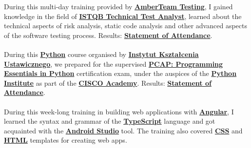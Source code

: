 \documentclass[theme]{cv_einstein}
\begin{document}
\begin{paracol}{2}
\begin{rightcolumn}
            {During this multi-day training provided by \href{https://www.amberteam.pl/}{\textbf{AmberTeam Testing}}, I gained knowledge in the field of \href{https://www.istqb.org/certifications/technical-test-analyst}{\textbf{ISTQB Technical Test Analyst}}, learned about the technical aspects of risk analysis, static code analysis and other advanced aspects of the software testing process.}
            {Results: \href{https://drive.google.com/file/d/1WwfEmnIlJKEFpINr4jTWSFmnCXFLiDe3/view}{\textbf{Statement of Attendance}}.}\\
            \vspace{\itemspace}\\
            {During this \href{https://www.python.org/}{\textbf{Python}} course organised by \href{http://iku-szkolenia.pl/}{\textbf{Instytut Kształcenia Ustawicznego}}, we prepared for the supervised \href{https://www.netacad.com/courses/programming/pcap-programming-essentials-python}{\textbf{PCAP: Programming Essentials in Python}} certification exam, under the auspices of the \href{https://pythoninstitute.org/}{\textbf{Python Institute}} as part of the \href{https://www.netacad.com/}{\textbf{CISCO Academy}}.}
            {Results: \href{https://drive.google.com/file/d/19MBRMRG7BXdnB-8vFiySWSYVE58n8XDh/view}{\textbf{Statement of Attendance}}.}\\
            \vspace{\itemspace}\\   
            {During this week-long training in building web applications with \href{https://angular.io/}{\textbf{Angular}}, I learned the syntax and grammar of the \href{https://www.typescriptlang.org/}{\textbf{TypeScript}} language and got acquainted with the \href{https://developer.android.com/studio}{\textbf{Android Studio}} tool. The training also covered \href{https://developer.mozilla.org/en-US/docs/Web/CSS}{\textbf{CSS}} and \href{https://www.w3.org/}{\textbf{HTML}} templates for creating web apps.}

\end{rightcolumn}
\end{paracol}
\end{document}
